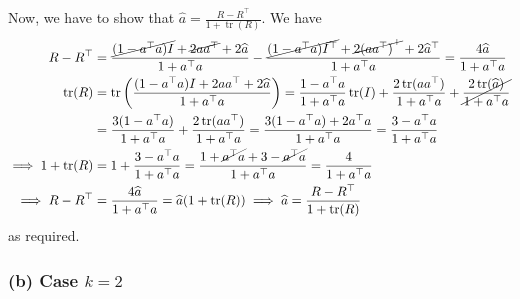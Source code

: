 Now, we have to show that \( \widehat{a} = \frac{R - R^{\top}}{1 + \operatorname{tr}(R)} \).
We have
\begin{align*}
    R - R^\top
     & =
    \frac{\cancel{(1 - a^{\top} a) I} + \cancel{2 a a^{\top}} + 2 \widehat{a}}{1 + a^{\top} a} - \frac{\cancel{(1 - a^{\top} a) I^\top} + \cancel{2 {(a a^{\top})}^\top} + 2 \widehat{a}^\top}{1 + a^{\top} a}
    =
    \frac{4 \widehat{a}}{1 + a^{\top} a}
    \\
    \operatorname{tr}(R)
     & =
    \operatorname{tr}\left( \frac{(1 - a^{\top} a) I + 2 a a^{\top} + 2 \widehat{a}}{1 + a^{\top} a} \right)
    =
    \frac{1 - a^{\top} a}{1 + a^{\top} a} \operatorname{tr}(I) + \frac{2 \operatorname{tr}(a a^{\top})}{1 + a^{\top} a} + \cancel{\frac{2 \operatorname{tr}(\widehat{a})}{1 + a^{\top} a}}
    \\ & =
    \frac{3 (1 - a^{\top} a)}{1 + a^{\top} a} + \frac{2 \operatorname{tr}(a a^{\top})}{1 + a^{\top} a}
    =
    \frac{3 (1 - a^{\top} a) + 2 a^{\top} a}{1 + a^{\top} a}
    =
    \frac{3 - a^{\top} a}{1 + a^{\top} a}
    \\
    \implies
    1 + \operatorname{tr}(R)
     & =
    1 + \frac{3 - a^{\top} a}{1 + a^{\top} a}
    =
    \frac{1 + \cancel{a^{\top} a} + 3 - \cancel{a^{\top} a}}{1 + a^{\top} a}
    =
    \frac{4}{1 + a^{\top} a}
    \\
    \implies
    R - R^\top
     & =
    \frac{4 \widehat{a}}{1 + a^{\top} a}
    =
    \widehat{a} (1 + \operatorname{tr}(R))
    \implies
    \widehat{a}
    =
    \frac{R - R^\top}{1 + \operatorname{tr}(R)}
\end{align*}
as required.

\clearpage
\subsubsection*{(b) Case \( k=2 \)}

